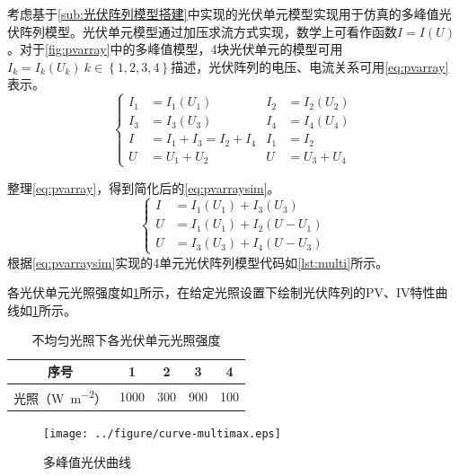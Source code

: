 \documentclass[a4paper,12pt]{article}
\begin{document}
    考虑基于\cref{sub:光伏阵列模型搭建}中实现的光伏单元模型实现用于仿真的多峰值光伏阵列模型。光伏单元模型通过加压求流方式实现，数学上可看作函数$I=I\left(U\right)$。对于\cref{fig:pvarray}中的多峰值模型，4块光伏单元的模型可用$I_k=I_k\left(U_k\right)\ k\in\left\{1,2,3,4\right\}$描述，光伏阵列的电压、电流关系可用\cref{eq:pvarray}表示。
    \begin{equation}\label{eq:pvarray}
      \left\{
      \begin{aligned}
      I_1&=I_1\left(U_1\right) &I_2&=I_2\left(U_2\right)\\
      I_3&=I_3\left(U_3\right) &I_4&=I_4\left(U_4\right)\\
      I&=I_1+I_3=I_2+I_4 &I_1&=I_2\\
      U&=U_1+U_2 &U&=U_3+U_4
      \end{aligned}\right.
    \end{equation}

    整理\cref{eq:pvarray}，得到简化后的\cref{eq:pvarraysim}。
    \begin{equation}\label{eq:pvarraysim}
      \left\{
      \begin{aligned}
      I&=I_1\left(U_1\right)+I_3\left(U_3\right)\\
      U&=I_1\left(U_1\right)+I_2\left(U-U_1\right)\\
      U&=I_3\left(U_3\right)+I_4\left(U-U_3\right)
      \end{aligned}\right.
    \end{equation}
    根据\cref{eq:pvarraysim}实现的4单元光伏阵列模型代码如\cref{lst:multi}所示。
    
    各光伏单元光照强度如\cref{tbl:4Iph}所示，在给定光照设置下绘制光伏阵列的PV、IV特性曲线如\cref{fig:curve-multimax}所示。
    \begin{table}[htbp]
      \centering
      \setlength{\abovecaptionskip}{0pt}
      \setlength{\belowcaptionskip}{10pt}
      \caption{不均匀光照下各光伏单元光照强度}\label{tbl:4Iph}
      \begin{tabular}{|c|c|c|c|c|}
        \hline
        序号 & 1 & 2 & 3 & 4 \\
        \hline
        光照（\si{\watt\per\meter\squared}） & 1000 & 300 & 900 & 100 \\
        \hline
      \end{tabular}
    \end{table}
    \begin{figure}[htbp]
        \centering
        \texttt{[image: ../figure/curve-multimax.eps]}
        \caption{多峰值光伏曲线}
        \label{fig:curve-multimax}
    \end{figure}
\end{document}
